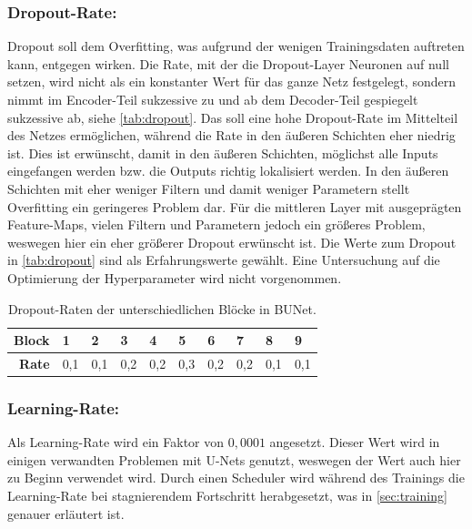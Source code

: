 \subsubsection{Dropout-Rate:} \label{sec:hyperparameter:dropout}

Dropout soll dem Overfitting, was aufgrund der wenigen Trainingsdaten auftreten kann, entgegen wirken. 
Die Rate, mit der die Dropout-Layer Neuronen auf null setzen, wird nicht als ein konstanter Wert für das ganze Netz festgelegt, 
sondern nimmt im Encoder-Teil sukzessive zu und ab dem Decoder-Teil gespiegelt sukzessive ab, siehe \autoref{tab:dropout}. 
Das soll eine hohe Dropout-Rate im Mittelteil des Netzes ermöglichen, während die Rate in den äußeren Schichten eher niedrig ist. 
Dies ist erwünscht, damit in den äußeren Schichten, möglichst alle Inputs eingefangen werden bzw. die Outputs richtig lokalisiert werden. 
In den äußeren Schichten mit eher weniger Filtern und damit weniger Parametern stellt Overfitting ein geringeres Problem dar. 
Für die mittleren Layer mit ausgeprägten Feature-Maps, vielen Filtern und Parametern jedoch ein größeres Problem, weswegen hier ein eher größerer
Dropout erwünscht ist. Die Werte zum Dropout in \autoref{tab:dropout} 
sind als Erfahrungswerte gewählt. Eine Untersuchung auf die Optimierung 
der Hyperparameter wird nicht vorgenommen.    

\begin{table}[ht]
	\centering
	\begin{tabular}{r|ll|ll|l|ll|ll}
		\textbf{Block} & 1 & 2 & 3 & 4 & 5  & 6 & 7 & 8 & 9 \\
		\midrule
		\textbf{Rate} & 0,1 & 0,1 & 0,2 & 0,2 & 0,3 & 0,2 & 0,2 & 0,1 & 0,1 \\ 
	\end{tabular}
	\caption{Dropout-Raten der unterschiedlichen Blöcke in \ac{BUNet}.}
	\label{tab:dropout}
\end{table}

\subsubsection{Learning-Rate:}

Als Learning-Rate wird ein Faktor von $0,0001$ angesetzt. Dieser Wert wird in einigen verwandten Problemen mit U-Nets genutzt, 
weswegen der Wert auch hier zu Beginn verwendet wird. Durch einen Scheduler wird während des Trainings die Learning-Rate bei stagnierendem Fortschritt 
herabgesetzt, was in \autoref{sec:training} genauer erläutert ist. 

